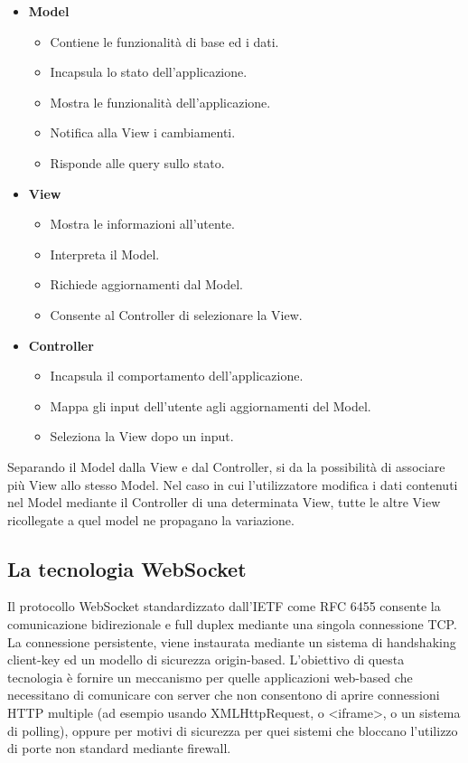 \documentclass[12pt]{article}
\begin{document}
\begin{itemize}
\item \textbf{Model}
\begin{itemize}
	\item Contiene le funzionalità di base ed i dati.
	\item Incapsula lo stato dell'applicazione.
	\item Mostra le funzionalità dell'applicazione.
	\item Notifica alla View i cambiamenti.
	\item Risponde alle query sullo stato. 
\end{itemize}
\item \textbf{View}
\begin{itemize}
	\item Mostra le informazioni all'utente.
	\item Interpreta il Model.
	\item Richiede aggiornamenti dal Model.
	\item Consente al Controller di selezionare la View.
\end{itemize}
\item \textbf{Controller}
\begin{itemize}
	\item Incapsula il comportamento dell'applicazione.
	\item Mappa gli input dell'utente agli aggiornamenti del Model.
	\item Seleziona la View dopo un input.
\end{itemize}
\end{itemize}
Separando il Model dalla View e dal Controller, si da la possibilità di associare più View allo stesso Model. Nel caso in cui l'utilizzatore modifica i dati contenuti nel Model mediante il Controller di una determinata
View, tutte le altre View ricollegate a quel model ne propagano la variazione.

\subsection{La tecnologia WebSocket}
Il protocollo WebSocket standardizzato dall'IETF come RFC 6455 consente la comunicazione bidirezionale e full duplex mediante una singola connessione TCP. La connessione persistente, viene instaurata mediante un sistema di handshaking client-key ed un modello di sicurezza origin-based. L'obiettivo di questa tecnologia è fornire un meccanismo per quelle applicazioni web-based che necessitano di comunicare con server che non consentono di aprire connessioni HTTP multiple (ad esempio usando XMLHttpRequest, o <iframe>, o un sistema di polling), oppure per motivi di sicurezza per quei sistemi che bloccano l'utilizzo di porte non standard mediante firewall.
\end{document}
